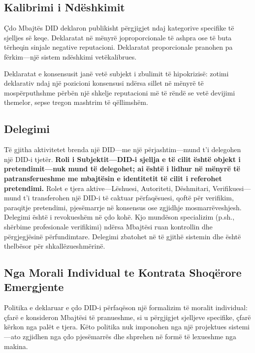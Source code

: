 \documentclass[11pt,a4paper,twocolumn]{article}
\begin{document}
\subsection{Kalibrimi i Ndëshkimit}

Çdo Mbajtës DID deklaron publikisht përgjigjet ndaj kategorive specifike të sjelljes së keqe. Deklaratat në mënyrë joproporcionale të ashpra ose të buta tërheqin sinjale negative reputacioni. Deklaratat proporcionale pranohen pa fërkim---një sistem ndëshkimi vetëkalibrues.

Deklaratat e konsensusit janë vetë subjekt i zbulimit të hipokrizisë: zotimi deklarativ ndaj një pozicioni konsensusi ndërsa sillet në mënyrë të mospërputhshme përbën një shkelje reputacioni më të rëndë se vetë devijimi themelor, sepse tregon mashtrim të qëllimshëm.

\subsection{Delegimi}

Të gjitha aktivitetet brenda një DID---me një përjashtim---mund t'i delegohen një DID-i tjetër. \textbf{Roli i Subjektit---DID-i sjellja e të cilit është objekt i pretendimit---nuk mund të delegohet; ai është i lidhur në mënyrë të patransferueshme me mbajtësin e identitetit të cilit i referohet pretendimi.} Rolet e tjera aktive---Lëshuesi, Autoriteti, Dëshmitari, Verifikuesi---mund t'i transferohen një DID-i të caktuar përfaqësuesi, qoftë për verifikim, paraqitje pretendimi, pjesëmarrje në konsensus ose zgjidhje mosmarrëveshjesh. Delegimi është i revokueshëm në çdo kohë. Kjo mundëson specializim (p.sh., shërbime profesionale verifikimi) ndërsa Mbajtësi ruan kontrollin dhe përgjegjësinë përfundimtare. Delegimi zbatohet në të gjithë sistemin dhe është thelbësor për shkallëzueshmërinë.

\subsection{Nga Morali Individual te Kontrata Shoqërore Emergjente}

Politika e deklaruar e çdo DID-i përfaqëson një formalizim të moralit individual: çfarë e konsideron Mbajtësi të pranueshme, si u përgjigjet sjelljeve specifike, çfarë kërkon nga palët e tjera. Këto politika nuk imponohen nga një projektues sistemi---ato zgjidhen nga çdo pjesëmarrës dhe shprehen në formë të lexueshme nga makina.
\end{document}

